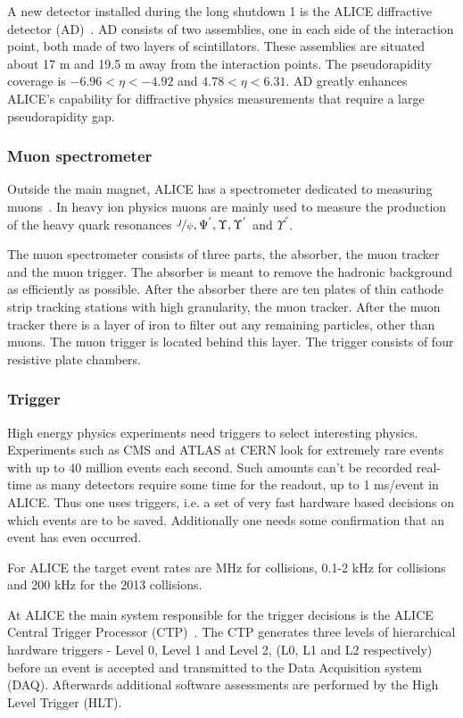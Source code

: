 A new detector installed during the long shutdown 1 is the ALICE diffractive detector (AD)~\cite{AD}. AD consists of two assemblies, one in each side of the interaction point, both made of two layers of scintillators. These assemblies are situated about 17 m and 19.5 m away from the interaction points. The pseudorapidity coverage is $-6.96 < \eta < -4.92 $ and $4.78 < \eta < 6.31$. AD greatly enhances ALICE's capability for diffractive physics measurements that require a large pseudorapidity gap.

\subsubsection{Muon spectrometer}
Outside the main magnet, ALICE has a spectrometer dedicated to measuring muons~\cite{MuonSpectro}. In heavy ion physics muons are mainly used to measure the production of the heavy quark resonances $\nicefrac{J}{\psi}, \Psi^{'}, \Upsilon, \Upsilon^{'}$ and $\Upsilon^{''}$.

The muon spectrometer consists of three parts, the absorber, the muon tracker and the muon trigger. The absorber is meant to remove the hadronic background as efficiently as possible. After the absorber there are ten plates of thin cathode strip tracking stations with high granularity, the muon tracker. After the muon tracker there is a layer of iron to filter out any remaining particles, other than muons. The muon trigger is located behind this layer. The trigger consists of four resistive plate chambers. 

\subsubsection{Trigger}
\label{sec:trigger}
High energy physics experiments need triggers to select interesting physics. Experiments such as CMS and ATLAS at CERN look for extremely rare events with up to 40 million events each second. Such amounts can't be recorded real-time as many detectors require some time for the readout, up to 1 ms/event in ALICE. Thus one uses triggers, i.e. a set of very fast hardware based decisions on which events are to be saved. Additionally one needs some confirmation that an event has even occurred. 

For ALICE the target event rates are \unit[1]{MHz} for \pp collisions, 0.1-2 \unit{kHz} for \PbPb collisions and 200 \unit{kHz} for the 2013 \pPb collisions.

At ALICE the main system responsible for the trigger decisions is the ALICE Central Trigger Processor (CTP)~\cite{ctp}. The CTP generates three levels of hierarchical hardware triggers - Level 0, Level 1 and Level 2, (L0, L1 and L2 respectively) before an event is accepted and transmitted to the Data Acquisition system (DAQ). Afterwards additional software assessments are performed by the High Level Trigger (HLT).

